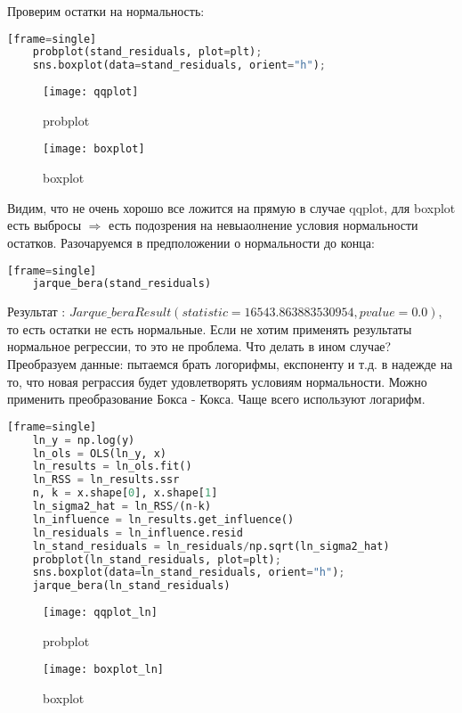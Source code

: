 	Проверим остатки на нормальность:
	
\begin{lstlisting}[language=Python][frame=single]
	probplot(stand_residuals, plot=plt);
	sns.boxplot(data=stand_residuals, orient="h");
\end{lstlisting}

\begin{figure}[h]
  \caption{probplot}
  \centering
    \texttt{[image: qqplot]}
\end{figure}
\begin{figure}[h]
  \caption{boxplot}
  \centering
    \texttt{[image: boxplot]}
\end{figure}

	Видим, что не очень хорошо все ложится на прямую в случае qqplot, для boxplot есть выбросы $ \Longrightarrow $ есть подозрения на невыаолнение условия нормальности остатков. Разочаруемся в предположении о нормальности до конца:

\begin{lstlisting}[language=Python][frame=single]
	jarque_bera(stand_residuals)
\end{lstlisting}

	Результат : $ Jarque\_beraResult(statistic=16543.863883530954, pvalue=0.0) $, то есть остатки не есть нормальные. Если не хотим применять результаты нормальное регрессии, то это не проблема. Что делать в ином случае? Преобразуем данные: пытаемся брать логорифмы, експоненту и т.д. в надежде на то, что новая реграссия будет удовлетворять условиям нормальности. Можно применить преобразование Бокса - Кокса. Чаще всего используют логарифм.

\begin{lstlisting}[language=Python][frame=single]
	ln_y = np.log(y)
	ln_ols = OLS(ln_y, x)
	ln_results = ln_ols.fit()
	ln_RSS = ln_results.ssr
	n, k = x.shape[0], x.shape[1]
	ln_sigma2_hat = ln_RSS/(n-k)
	ln_influence = ln_results.get_influence()
	ln_residuals = ln_influence.resid
	ln_stand_residuals = ln_residuals/np.sqrt(ln_sigma2_hat)
	probplot(ln_stand_residuals, plot=plt);
	sns.boxplot(data=ln_stand_residuals, orient="h");
	jarque_bera(ln_stand_residuals)
\end{lstlisting}

\begin{figure}[h]
  \caption{probplot}
  \centering
    \texttt{[image: qqplot\_ln]}
\end{figure}
\begin{figure}[h]
  \caption{boxplot}
  \centering
    \texttt{[image: boxplot\_ln]}
\end{figure}

